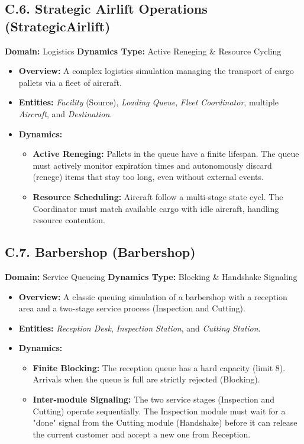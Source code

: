 \subsection{C.6. Strategic Airlift Operations (StrategicAirlift)}
\textbf{Domain:} Logistics 
\textbf{Dynamics Type:} Active Reneging \& Resource Cycling

\begin{itemize}[leftmargin=*]
\item \textbf{Overview:} A complex logistics simulation managing the transport of cargo pallets via a fleet of aircraft.
\item \textbf{Entities:} \textit{Facility} (Source), \textit{Loading Queue}, \textit{Fleet Coordinator}, multiple \textit{Aircraft}, and \textit{Destination}.
\item \textbf{Dynamics:}
\begin{itemize}
\item \textbf{Active Reneging:} Pallets in the queue have a finite lifespan. The queue must actively monitor expiration times and autonomously discard (renege) items that stay too long, even without external events.
\item \textbf{Resource Scheduling:} Aircraft follow a multi-stage state cycl. The Coordinator must match available cargo with idle aircraft, handling resource contention.
\end{itemize}
\end{itemize}

\subsection{C.7. Barbershop (Barbershop)}
\textbf{Domain:} Service Queueing 
\textbf{Dynamics Type:} Blocking \& Handshake Signaling

\begin{itemize}[leftmargin=*]
\item \textbf{Overview:} A classic queuing simulation of a barbershop with a reception area and a two-stage service process (Inspection and Cutting).
\item \textbf{Entities:} \textit{Reception Desk}, \textit{Inspection Station}, and \textit{Cutting Station}.
\item \textbf{Dynamics:}
\begin{itemize}
\item \textbf{Finite Blocking:} The reception queue has a hard capacity (limit 8). Arrivals when the queue is full are strictly rejected (Blocking).
\item \textbf{Inter-module Signaling:} The two service stages (Inspection and Cutting) operate sequentially. The Inspection module must wait for a "done" signal from the Cutting module (Handshake) before it can release the current customer and accept a new one from Reception.
\end{itemize}
\end{itemize}